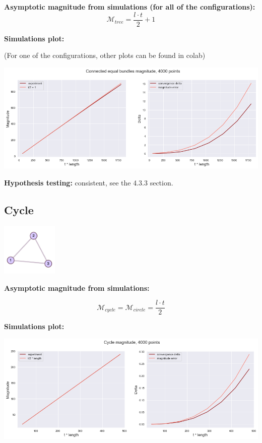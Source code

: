 \documentclass{article}
\begin{document}
\textbf{Asymptotic magnitude from simulations (for all of the configurations):}
$$\mathcal{M}_{tree} = \frac{l \cdot t}{2} + 1$$

\textbf{Simulations plot:}

(For one of the configurations, other plots can be found in colab)

\begin{center}
    \includegraphics[width=\textwidth]{comb_bundle_plot}
\end{center}

\textbf{Hypothesis testing:} consistent, see the 4.3.3 section. 

\subsection{Cycle}
\begin{center}
    \includegraphics[width=0.2\textwidth]{cicle_exp}
\end{center}


\textbf{Asymptotic magnitude from simulations:}

$$\mathcal{M}_{cycle} = \mathcal{M}_{circle} = \frac{l \cdot t}{2}$$

\textbf{Simulations plot:}

\begin{center}
\includegraphics[width=\textwidth]{cycle_plot} 
\end{center}
\end{document}
